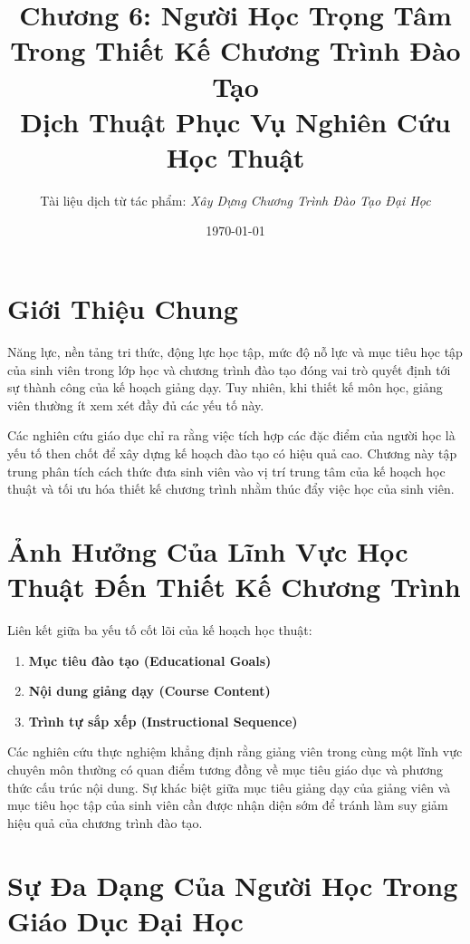 \documentclass[12pt,a4paper]{article}
\title{\textbf{Chương 6: Người Học Trọng Tâm Trong Thiết Kế Chương Trình Đào Tạo}\\
\large Dịch Thuật Phục Vụ Nghiên Cứu Học Thuật}
\author{Tài liệu dịch từ tác phẩm: \textit{Xây Dựng Chương Trình Đào Tạo Đại Học}}
\date{\today}
\begin{document}
\maketitle

\tableofcontents
\newpage

\section{Giới Thiệu Chung}

Năng lực, nền tảng tri thức, động lực học tập, mức độ nỗ lực và mục tiêu học tập của sinh viên trong lớp học và chương trình đào tạo đóng vai trò quyết định tới sự thành công của kế hoạch giảng dạy. Tuy nhiên, khi thiết kế môn học, giảng viên thường ít xem xét đầy đủ các yếu tố này.

Các nghiên cứu giáo dục chỉ ra rằng việc tích hợp các đặc điểm của người học là yếu tố then chốt để xây dựng kế hoạch đào tạo có hiệu quả cao. Chương này tập trung phân tích cách thức đưa sinh viên vào vị trí trung tâm của kế hoạch học thuật và tối ưu hóa thiết kế chương trình nhằm thúc đẩy việc học của sinh viên.

\section{Ảnh Hưởng Của Lĩnh Vực Học Thuật Đến Thiết Kế Chương Trình}

Liên kết giữa ba yếu tố cốt lõi của kế hoạch học thuật:
\begin{enumerate}
    \item \textbf{Mục tiêu đào tạo (Educational Goals)}
    \item \textbf{Nội dung giảng dạy (Course Content)}
    \item \textbf{Trình tự sắp xếp (Instructional Sequence)}
\end{enumerate}

Các nghiên cứu thực nghiệm khẳng định rằng giảng viên trong cùng một lĩnh vực chuyên môn thường có quan điểm tương đồng về mục tiêu giáo dục và phương thức cấu trúc nội dung. Sự khác biệt giữa mục tiêu giảng dạy của giảng viên và mục tiêu học tập của sinh viên cần được nhận diện sớm để tránh làm suy giảm hiệu quả của chương trình đào tạo.

\section{Sự Đa Dạng Của Người Học Trong Giáo Dục Đại Học}
\end{document}
